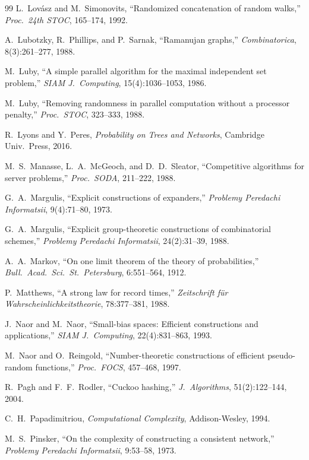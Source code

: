 \documentclass[twoside,12pt]{book}
\theoremstyle{plain}
\theoremstyle{definition}
\theoremstyle{remark}
\begin{document}
\begin{thebibliography}{99}
L.~Lov\'{a}sz and M.~Simonovits,
``Randomized concatenation of random walks,''
\textit{Proc.~24th STOC}, 165--174, 1992.

A.~Lubotzky, R.~Phillips, and P.~Sarnak,
``Ramanujan graphs,''
\textit{Combinatorica}, 8(3):261--277, 1988.

M.~Luby,
``A simple parallel algorithm for the maximal independent set problem,''
\textit{SIAM J.~Computing}, 15(4):1036--1053, 1986.

M.~Luby,
``Removing randomness in parallel computation without a processor penalty,''
\textit{Proc.~STOC}, 323--333, 1988.

R.~Lyons and Y.~Peres,
\textit{Probability on Trees and Networks},
Cambridge Univ.~Press, 2016.

M.~S.~Manasse, L.~A.~McGeoch, and D.~D.~Sleator,
``Competitive algorithms for server problems,''
\textit{Proc.~SODA}, 211--222, 1988.

G.~A.~Margulis,
``Explicit constructions of expanders,''
\textit{Problemy Peredachi Informatsii}, 9(4):71--80, 1973.

G.~A.~Margulis,
``Explicit group-theoretic constructions of combinatorial schemes,''
\textit{Problemy Peredachi Informatsii}, 24(2):31--39, 1988.

A.~A.~Markov,
``On one limit theorem of the theory of probabilities,''
\textit{Bull.~Acad.~Sci.~St.~Petersburg}, 6:551--564, 1912.

P.~Matthews,
``A strong law for record times,''
\textit{Zeitschrift f\"ur Wahrscheinlichkeitstheorie}, 78:377--381, 1988.

J.~Naor and M.~Naor,
``Small-bias spaces: Efficient constructions and applications,''
\textit{SIAM J.~Computing}, 22(4):831--863, 1993.

M.~Naor and O.~Reingold,
``Number-theoretic constructions of efficient pseudo-random functions,''
\textit{Proc.~FOCS}, 457--468, 1997.

R.~Pagh and F.~F.~Rodler,
``Cuckoo hashing,''
\textit{J.~Algorithms}, 51(2):122--144, 2004.

C.~H.~Papadimitriou,
\textit{Computational Complexity},
Addison-Wesley, 1994.

M.~S.~Pinsker,
``On the complexity of constructing a consistent network,''
\textit{Problemy Peredachi Informatsii}, 9:53--58, 1973.


\end{thebibliography}
\end{document}
